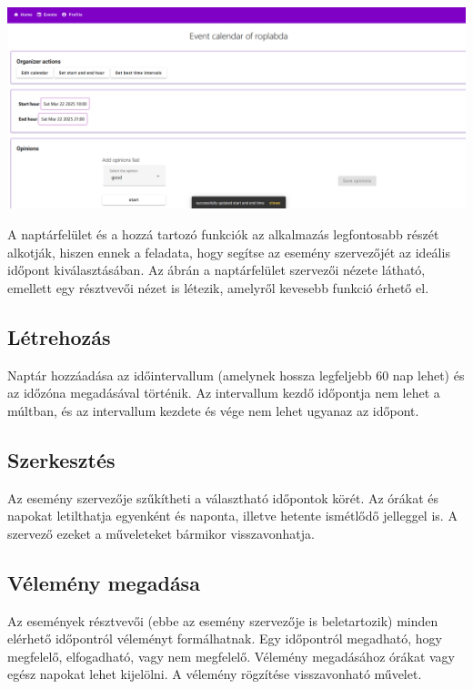 \documentclass[a4paper,12pt]{report}
\theoremstyle{definition}
\theoremstyle{remark}
\begin{document}
\begin{center}
\includegraphics[width=150mm]{calendar_editor}
\captionsetup{width=0.8\linewidth}
\end{center}

A naptárfelület és a hozzá tartozó funkciók az alkalmazás legfontosabb részét alkotják, hiszen ennek a feladata, hogy segítse az esemény szervezőjét az ideális időpont kiválasztásában. Az ábrán a naptárfelület szervezői nézete látható, emellett egy résztvevői nézet is létezik, amelyről kevesebb funkció érhető el.

	\subsection{Létrehozás}

Naptár hozzáadása az időintervallum (amelynek hossza legfeljebb 60 nap lehet) és az időzóna megadásával történik. Az intervallum kezdő időpontja nem lehet a múltban, és az intervallum kezdete és vége nem lehet ugyanaz az időpont.

	\subsection{Szerkesztés}

Az esemény szervezője szűkítheti a választható időpontok körét. Az órákat és napokat letilthatja egyenként és naponta, illetve hetente ismétlődő jelleggel is. A szervező ezeket a műveleteket bármikor visszavonhatja.

	\subsection{Vélemény megadása}

Az események résztvevői (ebbe az esemény szervezője is beletartozik) minden elérhető időpontról véleményt formálhatnak. Egy időpontról megadható, hogy megfelelő, elfogadható, vagy nem megfelelő. Vélemény megadásához órákat vagy egész napokat lehet kijelölni. A vélemény rögzítése visszavonható művelet.
\end{document}
